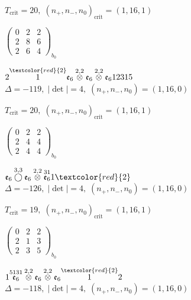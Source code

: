 \documentclass[10pt]{article}
\begin{document}
\hspace{1em}$T_{\text{crit}}=20,\; (n_+,n_-,n_0)_{\text{crit}}=(1,16,1)$

\hspace{2em}$\left(\begin{smallmatrix}0 & 2 & 2 \\ 2 & 8 & 6 \\ 2 & 6 & 4\end{smallmatrix}\right)_{\!b_0}$

\smallskip

$2\overset{\textcolor{red}{2}}{1}\mathfrak{e}_6\overset{2,2}{\otimes}\mathfrak{e}_6\overset{2,2}{\otimes}\mathfrak{e}_612315$ \quad $\Delta=-119,\; |\det|=4,\; (n_+,n_-,n_0)=(1,16,0)$

\hspace{1em}$T_{\text{crit}}=20,\; (n_+,n_-,n_0)_{\text{crit}}=(1,16,1)$

\hspace{2em}$\left(\begin{smallmatrix}0 & 2 & 2 \\ 2 & 4 & 4 \\ 2 & 4 & 4\end{smallmatrix}\right)_{\!b_0}$

\smallskip

$\mathfrak{e}_6\overset{3,3}{\bigcirc}\mathfrak{e}_6\overset{2,2}{\otimes}\overset{31}{\mathfrak{e}_6}1\textcolor{red}{2}$ \quad $\Delta=-126,\; |\det|=4,\; (n_+,n_-,n_0)=(1,16,0)$

\hspace{1em}$T_{\text{crit}}=19,\; (n_+,n_-,n_0)_{\text{crit}}=(1,16,1)$

\hspace{2em}$\left(\begin{smallmatrix}0 & 2 & 2 \\ 2 & 1 & 3 \\ 2 & 3 & 5\end{smallmatrix}\right)_{\!b_0}$

\smallskip

$1\overset{5131}{\mathfrak{e}_6}\overset{2,2}{\otimes}\mathfrak{e}_6\overset{2,2}{\otimes}\mathfrak{e}_6\overset{\textcolor{red}{2}}{1}2$ \quad $\Delta=-118,\; |\det|=4,\; (n_+,n_-,n_0)=(1,16,0)$
\end{document}
